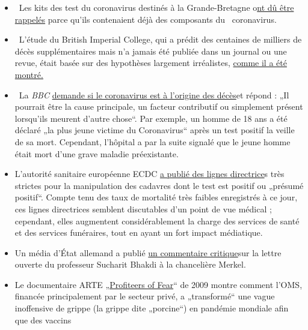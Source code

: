 \begin{itemize}
\tightlist
\item
  ~Les kits des test du coronavirus destinés à la Grande-Bretagne
  o\href{https://www.telegraph.co.uk/news/2020/03/30/uks-attempt-ramp-coronavirus-testing-hindered-key-components/}{nt
  dû être rappelés} parce qu'ils contenaient déjà des composants du~
  coronavirus.
\item
  ~L'étude du British Imperial College, qui a prédit des centaines de
  milliers de décès supplémentaires mais n'a jamais été publiée dans un
  journal ou une revue, était basée sur des hypothèses largement
  irréalistes,
  \href{https://judithcurry.com/2020/04/01/imperial-college-uk-covid-19-numbers-dont-seem-to-add-up/}{comme
  il a été montré.}
\item
  ~La \emph{BBC} \href{https://www.bbc.com/news/health-51979654}{demande
  si le coronavirus est à l'origine des décès}et répond : „Il pourrait
  être la cause principale, un facteur contributif ou simplement présent
  lorsqu'ils meurent d'autre chose``. Par exemple, un homme de 18 ans a
  été déclaré „la plus jeune victime du Coronavirus`` après un test
  positif la veille de sa mort. Cependant, l'hôpital a par la suite
  signalé que le jeune homme était mort d'une grave maladie
  préexistante.
\item
  L'autorité sanitaire européenne ECDC
  \href{https://www.ecdc.europa.eu/sites/default/files/documents/COVID-19-safe-handling-of-bodies-or-persons-dying-from-COVID19.pdf}{a
  publié des lignes directrice}s très strictes pour la manipulation des
  cadavres dont le test est positif ou „présumé positif``. Compte tenu
  des taux de mortalité très faibles enregistrés à ce jour, ces lignes
  directrices semblent discutables d'un point de vue médical ;
  cependant, elles augmentent considérablement la charge des services de
  santé et des services funéraires, tout en ayant un fort impact
  médiatique.
\item
  Un média d'État allemand a publié
  \href{https://www.br.de/nachrichten/wissen/bhakdis-brief-an-die-kanzlerin-was-ist-dran-an-seinen-fragen,RutYDhd}{un
  commentaire critique}sur la lettre ouverte du professeur Sucharit
  Bhakdi à la chancelière Merkel.
\item
  Le documentaire ARTE „\href{https://vimeo.com/403175258}{Profiteers of
  Fear}`` de 2009 montre comment l'OMS, financée principalement par le
  secteur privé, a „transformé`` une vague inoffensive de grippe (la
  grippe dite „porcine``) en pandémie mondiale afin que des vaccins

\end{itemize}
